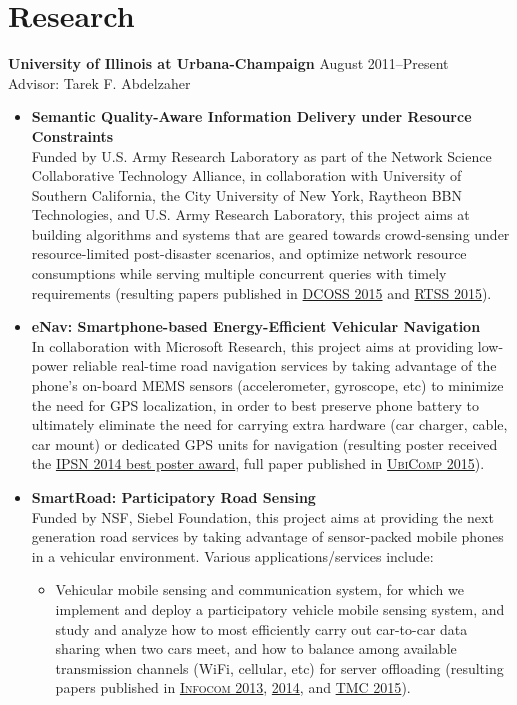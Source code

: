 \section{\sc Research} {\bf University of Illinois at Urbana-Champaign} \hfill August 2011--Present\\
Advisor: Tarek F. Abdelzaher
\begin{itemize}
\item \textbf{Semantic Quality-Aware Information Delivery under Resource Constraints}\\ Funded by U.S. Army Research Laboratory as part of the Network Science Collaborative Technology Alliance, in collaboration with University of Southern California, the City University of New York, Raytheon BBN Technologies, and U.S. Army Research Laboratory, this project aims at building algorithms and systems that are geared towards crowd-sensing under resource-limited post-disaster scenarios, and optimize network resource consumptions while serving multiple concurrent queries with timely requirements (resulting papers published in \hyperlink{hu2015dcoss}{\textsc{DCOSS 2015}} and \hyperlink{hu2015rtss}{\textsc{RTSS 2015}}).

\item \textbf{eNav: Smartphone-based Energy-Efficient Vehicular Navigation}\\ In collaboration with Microsoft Research, this project aims at providing low-power reliable real-time road navigation services by taking advantage of the phone's on-board MEMS sensors (accelerometer, gyroscope, etc) to minimize the need for GPS localization, in order to best preserve phone battery to ultimately eliminate the need for carrying extra hardware (car charger, cable, car mount) or dedicated GPS units for navigation (resulting poster received the \hyperlink{hu2014ipsn}{IPSN 2014 best poster award}, full paper published in \hyperlink{hu2015ubicomp}{\textsc{UbiComp 2015}}).

\item \textbf{SmartRoad: Participatory Road Sensing} \\
Funded by NSF, Siebel Foundation, this project aims at providing the next generation road services by taking advantage of sensor-packed mobile phones in a vehicular environment. Various applications/services include:
\begin{itemize}
\item Vehicular mobile sensing and communication system, for which we implement and deploy a participatory vehicle mobile sensing system, and study and analyze how to most efficiently carry out car-to-car data sharing when two cars meet, and how to balance among available transmission channels (WiFi, cellular, etc) for server offloading (resulting papers published in \hyperlink{liu2013infocom}{\textsc{Infocom 2013}}, \hyperlink{hu2014infocom}{\textsc{2014}}, and \hyperlink{hu2015tmc}{\textsc{TMC 2015}}).


\end{itemize}
\end{itemize}
